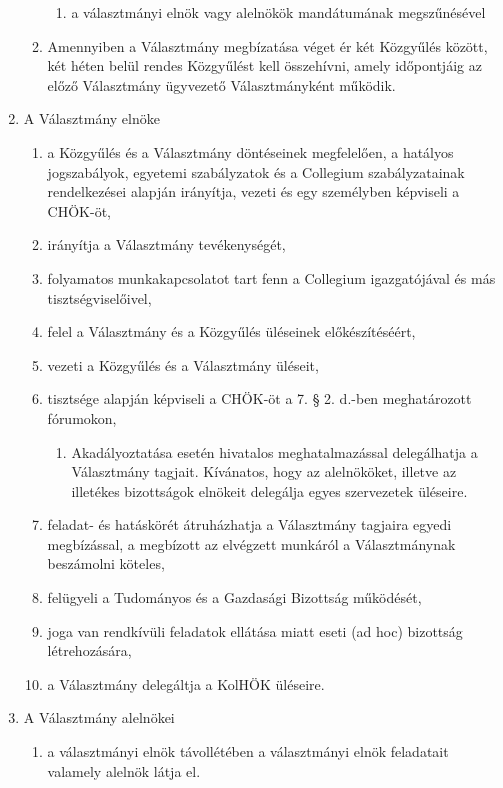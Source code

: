 \documentclass{../styles/rulebook}
\begin{document}
\begin{enumerate}
\begin{enumerate}
\begin{enumerate}
			\item a választmányi elnök vagy alelnökök mandátumának megszűnésével
		\end{enumerate}
		\item Amennyiben a Választmány megbízatása véget ér két Közgyűlés között, két héten belül rendes Közgyűlést kell összehívni, amely időpontjáig az előző Választmány ügyvezető Választmányként működik.
	\end{enumerate}
	\item A Választmány elnöke
	\begin{enumerate}	
		\item a Közgyűlés és a Választmány döntéseinek megfelelően, a hatályos jogszabályok, egyetemi szabályzatok és a Collegium szabályzatainak rendelkezései alapján irányítja, vezeti és egy személyben képviseli a CHÖK-öt,
		\item irányítja a Választmány tevékenységét,
		\item folyamatos munkakapcsolatot tart fenn a Collegium igazgatójával és más tisztségviselőivel,
		\item felel a Választmány és a Közgyűlés üléseinek előkészítéséért, 
		\item vezeti a Közgyűlés és a Választmány üléseit,
		\item tisztsége alapján képviseli a CHÖK-öt a 7. § 2. d.-ben meghatározott fórumokon,
		\begin{enumerate}
			\item Akadályoztatása esetén hivatalos meghatalmazással delegálhatja a Választmány tagjait. Kívánatos, hogy az alelnököket, illetve az illetékes bizottságok elnökeit delegálja egyes szervezetek üléseire.
		\end{enumerate}
		\item feladat- és hatáskörét átruházhatja a Választmány tagjaira egyedi megbízással, a megbízott az elvégzett munkáról a Választmánynak beszámolni köteles,
		\item felügyeli a Tudományos és a Gazdasági Bizottság működését,
		\item joga van rendkívüli feladatok ellátása miatt eseti (ad hoc) bizottság létrehozására,
		\item a Választmány delegáltja a KolHÖK üléseire.
	\end{enumerate}
	\item A Választmány alelnökei
		\begin{enumerate}
		\item a választmányi elnök távollétében a választmányi elnök feladatait valamely alelnök látja el.

\end{enumerate}
\end{enumerate}
\end{document}
